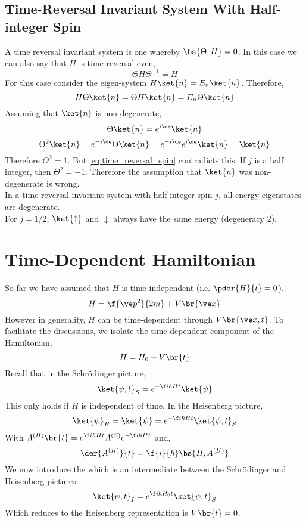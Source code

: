 \documentclass{article}
\begin{document}
\subsection{Time-Reversal Invariant System With Half-integer Spin}
A time reversal invariant system is one whereby $\bs{\Theta, H} = 0$. In this case we can also say that $H$ is time reversal even,
\[ \Theta H \Theta^{-1} = H \]
For this case consider the eigen-system $H\ket{n} = E_n\ket{n}$. Therefore,
\[ H \Theta \ket{n} = \Theta H \ket{n} = E_n \Theta \ket{n} \]
Assuming that $\ket{n}$ is non-degenerate,
\[ \Theta \ket{n} = e^{i \de} \ket{n} \]
\[ \Theta^2 \ket{n} = e^{-i\de} \Theta \ket{n} = e^{-i\de}e^{i\de} \ket{n} = \ket{n} \]
Therefore $\Theta^2 = 1$. But \cref{eq:time_reversal_spin} contradicts this. If $j$ is a half integer, then $\Theta^2 = -1$. Therefore the assumption that $\ket{n}$ was non-degenerate is wrong.\\

 In a time-reversal invariant system with half integer spin $j$, all energy eigenstates are degenerate.\\

For $j = 1/2$, $\ket{\uparrow}$ and $\downarrow$ always have the same energy (degeneracy $2$).

\section{Time-Dependent Hamiltonian}
So far we have assumed that $H$ is time-independent (i.e. $\pder{H}{t} = 0$).
\[ H = \f{\ve p^2}{2m} + V\br{\ve x} \]
However in generality, $H$ can be time-dependent through $V\br{\ve x, t}$. To facilitate the discussions, we isolate the time-dependent component of the Hamiltonian,
\[ H = H_0 + V\br{t} \]
Recall that in the Schrödinger picture,
\[ \ket{\psi, t}_S = e^{- \f i \hbar H t}\ket{\psi} \]
This only holds if $H$ is independent of time. In the Heisenberg picture,
\[ \ket{\psi}_H = \ket{\psi} = e^{- \f i \hbar H t} \ket{\psi, t}_S \]
With $A^{(H)}\br{t} = e^{\f i \hbar H t} A^{(S)} e^{-\f i \hbar H t}$ and,
\[ \der{A^{(H)}}{t} = \f{i}{\hbar} \bs{H, A^{(H)}} \]
We now introduce the  which is an intermediate between the Schrödinger and Heisenberg pictures.
\[ \ket{\psi, t}_I = e^{\f i \hbar H_0 t} \ket{\psi, t}_S \]
Which reduces to the Heisenberg representation is $V\br{t} = 0$.
\end{document}
